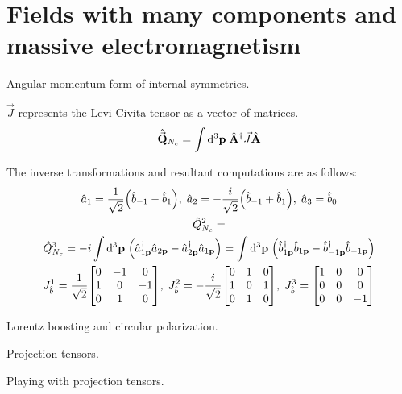 \documentclass{report}
\begin{document}
\chapter{Fields with many components and massive electromagnetism}

\begin{subquests}
	\item Angular momentum form of internal symmetries.
	\begin{subquests}
		\item
		$\vec{J}$ represents the Levi-Civita tensor as a vector of matrices.
		\begin{gather*}
			\hat{\vec{{\vb Q}}}_{N_c} = \int \dd^3{\vb p}\;\hat{\vb A}^{\dagger}\vec{J}\hat{\vb A} 
		\end{gather*}

		\item
		The inverse transformations and resultant computations are as follows:
		\begin{gather*}
			\hat{a}_1 = \frac{1}{\sqrt 2}\pqty{\hat{b}_{-1} - \hat{b}_1},\; \hat{a}_2 = -\frac{i}{\sqrt 2}\pqty{\hat{b}_{-1} + \hat{b}_{1}},\; \hat{a}_3 = \hat{b}_0 \\
			\hat{Q}^{2}_{N_c} = \\
			\hat{Q}^{3}_{N_c} = -i\int \dd^3{\vb p}\;\pqty{\hat{a}_{1\vb p}^{\dagger}\hat{a}_{2\vb p} - \hat{a}^{\dagger}_{2 \vb p}\hat{a}_{1\vb p}} = \int \dd^3{\vb p}\;\pqty{\hat{b}^{\dagger}_{1\vb p}\hat{b}_{1\vb p} - \hat{b}^{\dagger}_{-1\vb p}\hat{b}_{-1\vb p}} \\
			J_{\hat{b}}^1 = \frac{1}{\sqrt 2}
			\mqty[
				0 & -1 & 0 \\
				1 & 0 & -1 \\
				0 & 1 & 0
			],\;
			J_{\hat{b}}^2 = -\frac{i}{\sqrt 2}
			\mqty[
				0 & 1 & 0 \\
				1 & 0 & 1 \\
				0 & 1 & 0	
			],\;
			J_{\hat{b}}^3 = 
			\mqty[
				1 & 0 & 0 \\
				0 & 0 & 0 \\
				0 & 0 & -1	
			] 
		\end{gather*}
	\end{subquests}
	
	\item Lorentz boosting and circular polarization.
	\begin{subquests}
		\item

		\item

		\item
	\end{subquests}

	\item Projection tensors.

	\item Playing with projection tensors.
\end{subquests}
\end{document}

